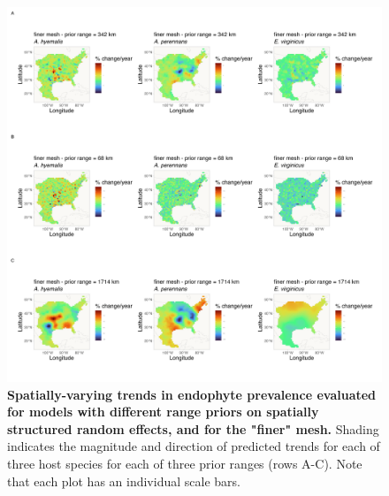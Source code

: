 \documentclass[11pt]{article}
\begin{document}
\begin{figure}[H]
	\centering
	\includegraphics[width = .8\linewidth]{../Plots/finer_mesh_comparison_svc_plot.png}
	\caption[Spatially-varying trends in endophyte prevalence evaluated for models with different range priors on spatially structured random effects, and for the "finer" mesh]{\textbf{Spatially-varying trends in endophyte prevalence evaluated for models with different range priors on spatially structured random effects, and for the "finer" mesh.} Shading indicates the magnitude and direction of predicted trends for each of three host species for each of three prior ranges (rows A-C). Note that each plot has an individual scale bars.}
	\label{fig:finer_comparison_svc_plot}
\end{figure}


	
\end{document}
